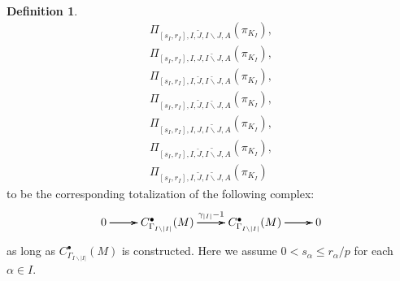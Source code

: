 \documentclass[12pt]{amsart}
\theoremstyle{definition}
\newtheorem{definition}[theorem]{Definition}
\numberwithin{equation}{section}
\begin{document}
\begin{definition}
\begin{align}
\Pi_{[s_I,r_I],I,\widetilde{J},I\backslash J,A}(\pi_{K_I}),\\
\Pi_{[s_I,r_I],I,J,\breve{I\backslash J},A}(\pi_{K_I}),\\	
\Pi_{[s_I,r_I],I,\breve{J},\breve{I\backslash J},A}(\pi_{K_I}),\\
\Pi_{[s_I,r_I],I,\widetilde{J},\breve{I\backslash J},A}(\pi_{K_I}),\\
\Pi_{[s_I,r_I],I,J,\widetilde{I\backslash J},A}(\pi_{K_I}),\\	
\Pi_{[s_I,r_I],I,\breve{J},\widetilde{I\backslash J},A}(\pi_{K_I}),\\
\Pi_{[s_I,r_I],I,\widetilde{J},\widetilde{I\backslash J},A}(\pi_{K_I})	
\end{align}	
to be the corresponding totalization of the following complex:
\[
\xymatrix@C+0pc@R+0pc{
0 \ar[r] \ar[r] \ar[r] &C^\bullet_{\Gamma_{I\backslash |I|}}(M) \ar[r]^{\gamma_{|I|}-1}\ar[r]\ar[r] &C^\bullet_{\Gamma_{I\backslash |I|}}(M) \ar[r] \ar[r] \ar[r] &0
}
\]
as long as $C^\bullet_{\Gamma_{I\backslash |I|}}(M)$ is constructed. Here we assume $0< s_\alpha \leq r_\alpha/p$ for each $\alpha\in I$.	
\end{definition}
\end{document}
